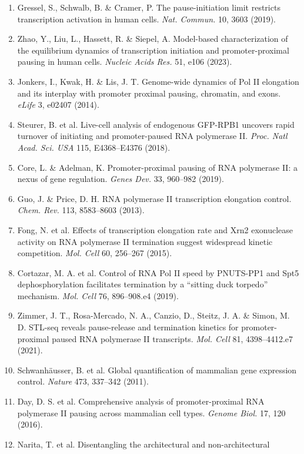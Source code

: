 \documentclass[11pt]{article}
\begin{document}
\begin{enumerate}
\textit{Zenodo} \url{https://doi.org/10.5281/zenodo.3579473} (2019).
\item Gressel, S., Schwalb, B. \& Cramer, P. The pause-initiation limit restricts
transcription activation in human cells. \textit{Nat. Commun.} 10, 3603 (2019).
\item Zhao, Y., Liu, L., Hassett, R. \& Siepel, A. Model-based characterization of
the equilibrium dynamics of transcription initiation and promoter-proximal pausing
in human cells. \textit{Nucleic Acids Res.} 51, e106 (2023).
\item Jonkers, I., Kwak, H. \& Lis, J. T. Genome-wide dynamics of Pol II elongation and
its interplay with promoter proximal pausing, chromatin, and exons. \textit{eLife} 3,
e02407 (2014).
\item Steurer, B. et al. Live-cell analysis of endogenous GFP-RPB1 uncovers rapid turnover
of initiating and promoter-paused RNA polymerase II. \textit{Proc. Natl Acad. Sci. USA}
115, E4368--E4376 (2018).
\item Core, L. \& Adelman, K. Promoter-proximal pausing of RNA polymerase II: a nexus
of gene regulation. \textit{Genes Dev.} 33, 960--982 (2019).
\item Guo, J. \& Price, D. H. RNA polymerase II transcription elongation control.
\textit{Chem. Rev.} 113, 8583--8603 (2013).
\item Fong, N. et al. Effects of transcription elongation rate and Xrn2 exonuclease
activity on RNA polymerase II termination suggest widespread kinetic competition.
\textit{Mol. Cell} 60, 256--267 (2015).
\item Cortazar, M. A. et al. Control of RNA Pol II speed by PNUTS-PP1 and Spt5
dephosphorylation facilitates termination by a ``sitting duck torpedo'' mechanism.
\textit{Mol. Cell} 76, 896--908.e4 (2019).
\item Zimmer, J. T., Rosa-Mercado, N. A., Canzio, D., Steitz, J. A. \& Simon, M. D.
STL-seq reveals pause-release and termination kinetics for promoter-proximal paused
RNA polymerase II transcripts. \textit{Mol. Cell} 81, 4398--4412.e7 (2021).
\item Schwanh\"ausser, B. et al. Global quantification of mammalian gene expression
control. \textit{Nature} 473, 337--342 (2011).
\item Day, D. S. et al. Comprehensive analysis of promoter-proximal RNA polymerase II
pausing across mammalian cell types. \textit{Genome Biol.} 17, 120 (2016).
\item Narita, T. et al. Disentangling the architectural and non-architectural

\end{enumerate}
\end{document}
